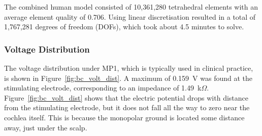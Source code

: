 The combined human model consisted of 10,361,280 tetrahedral elements with an
average element quality of 0.706. Using linear discretisation resulted in a
total of 1,767,281 degrees of freedom (DOFs), which took about 4.5 minutes to
solve.

\subsubsection{Voltage Distribution}

The voltage distribution under MP1, which is typically used in clinical
practice, is shown in Figure~\ref{fig:bc_volt_dist}. A maximum of 0.159~V was
found at the stimulating electrode, corresponding to an impedance of 1.49~k$
\Omega $. Figure~\ref{fig:bc_volt_dist} shows that the electric potential drops
with distance from the stimulating electrode, but it does not fall all the way
to zero near the cochlea itself. This is because the monopolar ground is located
some distance away, just under the scalp.

